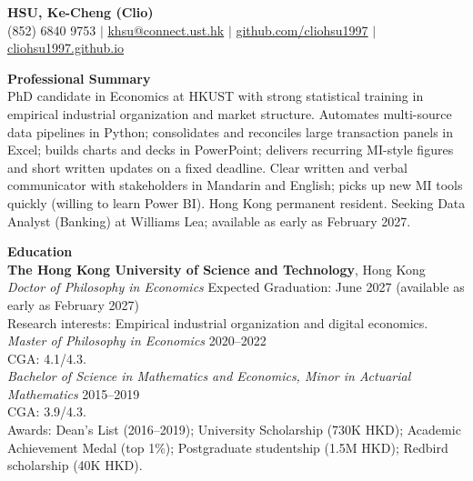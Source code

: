 \documentclass[11pt,letterpaper]{article}
\begin{document}
{\Large \textbf{HSU, Ke-Cheng (Clio)}}\\[1pt]
(852) 6840 9753 \quad $|$ \quad \href{mailto:khsu@connect.ust.hk}{khsu@connect.ust.hk} \quad $|$ \quad \href{https://github.com/cliohsu1997}{github.com/cliohsu1997} \quad $|$ \quad \href{https://cliohsu1997.github.io/}{cliohsu1997.github.io}

\vspace{0.15pt}

{\large \textbf{Professional Summary}}\\[-0.5pt]
PhD candidate in Economics at HKUST with strong statistical training in empirical industrial organization and market structure. Automates multi-source data pipelines in Python; consolidates and reconciles large transaction panels in Excel; builds charts and decks in PowerPoint; delivers recurring MI-style figures and short written updates on a fixed deadline. Clear written and verbal communicator with stakeholders in Mandarin and English; picks up new MI tools quickly (willing to learn Power BI). Hong Kong permanent resident. Seeking Data Analyst (Banking) at Williams Lea; available as early as February 2027.

\vspace{0.15pt}

{\large \textbf{Education}}\\[-0.5pt]
\textbf{The Hong Kong University of Science and Technology}, Hong Kong\\
\textit{Doctor of Philosophy in Economics} \hfill Expected Graduation: June 2027 (available as early as February 2027)\\
Research interests: Empirical industrial organization and digital economics.\\
\textit{Master of Philosophy in Economics} \hfill 2020--2022\\
CGA: 4.1/4.3.\\
\textit{Bachelor of Science in Mathematics and Economics, Minor in Actuarial Mathematics} \hfill 2015--2019\\
CGA: 3.9/4.3.\\
Awards: Dean's List (2016--2019); University Scholarship (730K HKD); Academic Achievement Medal (top 1\%); Postgraduate studentship (1.5M HKD); Redbird scholarship (40K HKD).

\vspace{0.15pt}
\end{document}

